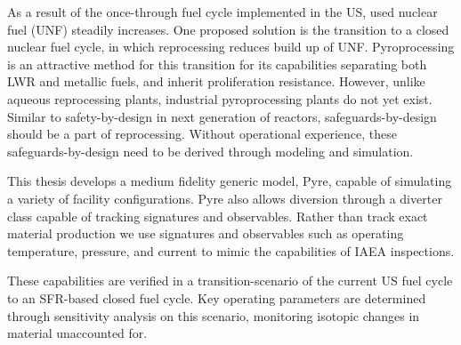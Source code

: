 \vspace{-0.4in}

As a result of the once-through fuel cycle implemented in the US, used nuclear fuel (UNF) steadily increases. One proposed solution is the transition to a closed nuclear fuel cycle, in which reprocessing reduces build up of UNF. Pyroprocessing is an attractive method for this transition for its capabilities separating both LWR and metallic fuels, and inherit proliferation resistance. However, unlike aqueous reprocessing plants, industrial pyroprocessing plants do not yet exist. Similar
to safety-by-design in next generation of reactors, safeguards-by-design should be
a part of reprocessing. Without operational experience, these safeguards-by-design need to be derived through modeling and simulation. 

This thesis develops a medium fidelity generic model, Pyre, capable of simulating a variety of facility configurations. Pyre also allows diversion through a diverter class capable of tracking signatures and observables. Rather than track exact material production we use signatures and observables such as operating temperature, pressure, and current to mimic the capabilities of IAEA inspections.

These capabilities are verified in a transition-scenario of the current US fuel cycle to an SFR-based closed fuel cycle. Key operating parameters are determined through
sensitivity analysis on this scenario, monitoring isotopic changes in material unaccounted for.